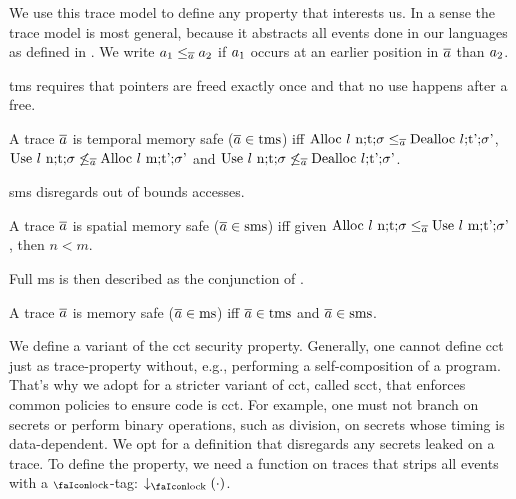 \documentclass[acmsmall,review,screen,dvipsnames]{acmart}
\begin{document}
We use this trace model to define any property that interests us.
In a sense the trace model is most general, because it abstracts all events done in our languages as defined in .
We write $\event[_{1}]\le_{\trace}\event[_{2}]$ if $\event[_{1}]$ occurs at an earlier position in $\trace$ than $\event[_{2}]$.

\gls{tms} requires that pointers are freed exactly once and that no use happens after a free.

\begin{definition}\label{def:trace:tmsdef}
  A trace $\trace$ is temporal memory safe ($\trace\in\tmssafe$) iff $\ev{Alloc\ \loc\ n;\sandboxtag;\securitytag}\le_{\trace}\ev{Dealloc\ \loc;\sandboxtag';\securitytag'}$, $\ev{Use\ \loc\ n;\sandboxtag;\securitytag}\not\le_{\trace}\ev{Alloc\ \loc\ m;\sandboxtag';\securitytag'}$ and $\ev{Use\ \loc\ n;\sandboxtag;\securitytag}\not\le_{\trace}\ev{Dealloc\ \loc;\sandboxtag';\securitytag'}$.
\end{definition}

\gls{sms} disregards out of bounds accesses.

\begin{definition}\label{def:trace:smsdef}
  A trace $\trace$ is spatial memory safe ($\trace\in\smssafe$) iff given $\ev{Alloc\ \loc\ n;\sandboxtag;\securitytag}\le_{\trace}\ev{Use\ \loc\ m;\sandboxtag';\securitytag'}$, then $n<m$.
\end{definition}

Full \gls{ms} is then described as the conjunction of .

\begin{definition}[\glsfirst{ms}]\label{def:trace:msdef}
  A trace $\trace$ is memory safe ($\trace\in\mssafe$) iff $\trace\in\tmssafe$ and $\trace\in\smssafe$.
\end{definition}

We define a variant of the \gls{cct} security property.
Generally, one cannot define \gls{cct} just as trace-property without, e.g., performing a self-composition of a program.
That's why we adopt for a stricter variant of \gls{cct}, called \gls{scct}, that enforces common policies to ensure code is \gls{cct}.
For example, one must not branch on secrets or perform binary operations, such as division, on secrets whose timing is data-dependent.
We opt for a definition that disregards any secrets leaked on a trace.
To define the property, we need a function on traces that strips all events with a $\lock$-tag: $\downarrow_{\lock}(\cdot)$.
\end{document}
